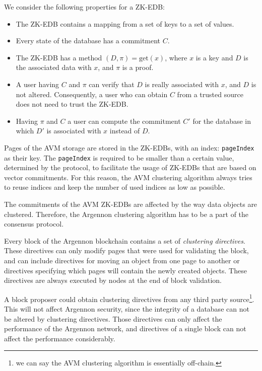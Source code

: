 We consider the following properties for a ZK-EDB:
\begin{itemize}
    \item The ZK-EDB contains a mapping from a set of keys to a set of values.
    \item Every state of the database has a commitment \(C\).
    \item The ZK-EDB has a method \((D, \pi) = \text{get}(x)\), where \(x\) is a key and \(D\) is the associated data
    with \(x\), and \(\pi\) is a proof.
    \item A user having \(C\) and \(\pi\) can verify that \(D\) is really associated with \(x\), and \(D\) is not
    altered. Consequently, a user who can obtain \(C\) from a trusted source does not need to trust the ZK-EDB\@.
    \item Having \(\pi\) and \(C\) a user can compute the commitment \(C'\) for the database in which \(D'\) is
    associated with \(x\) instead of \(D\).
\end{itemize}

Pages of the AVM storage are stored in the ZK-EDBs, with an index: \texttt{pageIndex} as their key.
The \texttt{pageIndex} is required to be smaller than a certain value, determined by the
protocol, to facilitate the usage of ZK-EDBs that are based on vector commitments.
For this reason, the AVM clustering algorithm always tries to reuse indices and keep the number of used indices
as low as possible.

The commitments of the AVM ZK-EDBs are affected by the way data objects are clustered. Therefore,
the Argennon clustering algorithm has to be a part of the consensus protocol.

Every block of the Argennon blockchain contains a set of \emph{clustering directives}. These directives
can only modify pages that were used for validating the block, and can
include directives for moving an object from one page to another or directives specifying which pages will contain
the newly created objects. These directives are always executed by nodes at the end of block validation.

A block proposer could obtain clustering directives from any third party source\footnote{we can say the AVM clustering
algorithm is essentially off-chain.}. This will not
affect Argennon security, since the integrity of a database can not be altered by clustering directives.
Those directives can only affect the performance of the Argennon network, and directives of a single block can
not affect the performance considerably.

